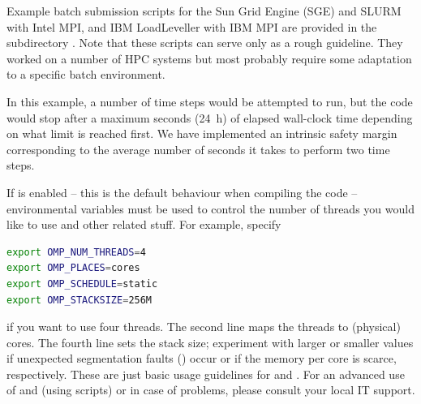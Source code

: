 \documentclass[a4paper, 11pt, DIV=11]{scrartcl}
\begin{document}
Example batch submission scripts for the Sun Grid Engine (SGE) and
SLURM with Intel MPI, and IBM LoadLeveller with IBM MPI are provided
in the subdirectory . Note that these scripts can serve only
as a rough guideline. They worked on a number of HPC systems but most
probably require some adaptation to a specific batch environment.
\par
In this example, a number of  time steps would be attempted
to run, but the code would stop after a maximum  seconds
(\SI{24}{\hour}) of elapsed wall-clock time depending on what limit is reached
first. We have implemented an intrinsic safety margin corresponding to the
average number of seconds it takes to perform two time steps.
\par
If \omp is enabled -- this is the default behaviour when compiling the code --
environmental variables must be used to control the number of threads you would 
like to use and other related stuff. For example, specify
\begin{lstlisting}[language=bash]
export OMP_NUM_THREADS=4
export OMP_PLACES=cores
export OMP_SCHEDULE=static
export OMP_STACKSIZE=256M
\end{lstlisting}
if you want to use four \omp threads. The second line maps the threads to 
(physical) cores. The fourth line sets the stack size; experiment with larger or
smaller values if unexpected segmentation faults () occur or if the
memory per core is scarce, respectively. These are just basic usage guidelines for
\mpi and \omp. For an advanced use of \mpi and \omp (\eg using  
scripts) or in case of problems, please consult your local IT support.
\end{document}
